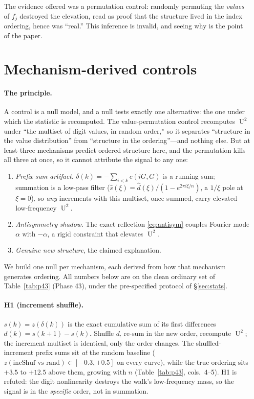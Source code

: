 \documentclass[11pt]{article}
\theoremstyle{definition}
\DeclareMathOperator{\Uk}{U}
\begin{document}
The evidence offered was a permutation control: randomly permuting the
\emph{values} of $f_j$ destroyed the elevation, read as proof that the
structure lived in the index ordering, hence was ``real.'' This inference
is invalid, and seeing why is the point of the paper.

\section{Mechanism-derived controls}\label{sec:controls}

\paragraph{The principle.} A control is a null model, and a null tests
exactly one alternative: the one under which the statistic is recomputed.
The value-permutation control recomputes $\Uk^2$ under ``the multiset of
digit values, in random order,'' so it separates ``structure in the value
distribution'' from ``structure in the ordering''---and nothing else. But
at least three mechanisms predict ordered structure here, and the
permutation kills all three at once, so it cannot attribute the signal to
any one:
\begin{enumerate}
\item[(H1)] \emph{Prefix-sum artifact.} $\delta(k)=-\sum_{i<k}c(iG,G)$ is
a running sum; summation is a low-pass filter
($\hat s(\xi)=\hat d(\xi)/(1-e^{2\pi i\xi/n})$, a $1/\xi$ pole at
$\xi=0$), so \emph{any} increments with this multiset, once summed, carry
elevated low-frequency $\Uk^2$.
\item[(H2)] \emph{Antisymmetry shadow.} The exact reflection
\eqref{eq:antisym} couples Fourier mode $\alpha$ with $-\alpha$, a rigid
constraint that elevates $\Uk^2$.
\item[(H3)] \emph{Genuine new structure}, the claimed explanation.
\end{enumerate}
We build one null per mechanism, each derived from how that mechanism
generates ordering. All numbers below are on the clean ordinary set of
Table~\ref{tab:p43} (Phase 43), under the pre-specified protocol of
\S\ref{sec:stats}.

\paragraph{H1 (increment shuffle).} $s(k)=z(\delta(k))$ is the exact
cumulative sum of its first differences $d(k)=s(k+1)-s(k)$. Shuffle $d$,
re-sum in the new order, recompute $\Uk^2$; the increment multiset is
identical, only the order changes. The shuffled-increment prefix sums sit
\emph{at} the random baseline ($z(\text{incShuf vs rand})\in[-0.3,+0.5]$
on every curve), while the true ordering sits $+3.5$ to $+12.5$ above
them, growing with $n$ (Table~\ref{tab:p43}, cols.\ 4--5). H1 is refuted:
the digit nonlinearity destroys the walk's low-frequency mass, so the
signal is in the \emph{specific} order, not in summation.
\end{document}
